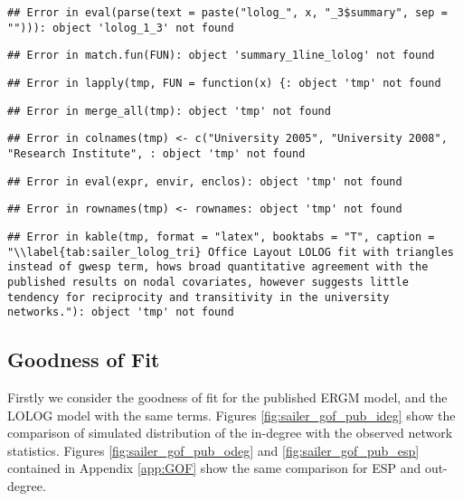 \documentclass[
]{statsoc}
\begin{document}
\begin{verbatim}
## Error in eval(parse(text = paste("lolog_", x, "_3$summary", sep = ""))): object 'lolog_1_3' not found
\end{verbatim}

\begin{verbatim}
## Error in match.fun(FUN): object 'summary_1line_lolog' not found
\end{verbatim}

\begin{verbatim}
## Error in lapply(tmp, FUN = function(x) {: object 'tmp' not found
\end{verbatim}

\begin{verbatim}
## Error in merge_all(tmp): object 'tmp' not found
\end{verbatim}

\begin{verbatim}
## Error in colnames(tmp) <- c("University 2005", "University 2008", "Research Institute", : object 'tmp' not found
\end{verbatim}

\begin{verbatim}
## Error in eval(expr, envir, enclos): object 'tmp' not found
\end{verbatim}

\begin{verbatim}
## Error in rownames(tmp) <- rownames: object 'tmp' not found
\end{verbatim}

\begin{verbatim}
## Error in kable(tmp, format = "latex", booktabs = "T", caption = "\\label{tab:sailer_lolog_tri} Office Layout LOLOG fit with triangles instead of gwesp term, hows broad quantitative agreement with the published results on nodal covariates, however suggests little tendency for reciprocity and transitivity in the university networks."): object 'tmp' not found
\end{verbatim}

\subsection{Goodness of Fit}

Firstly we consider the goodness of fit for the published ERGM model,
and the LOLOG model with the same terms. Figures
\ref{fig:sailer_gof_pub_ideg} show the comparison of simulated
distribution of the in-degree with the observed network statistics.
Figures \ref{fig:sailer_gof_pub_odeg} and \ref{fig:sailer_gof_pub_esp}
contained in Appendix \ref{app:GOF} show the same comparison for ESP and
out-degree.
\end{document}
